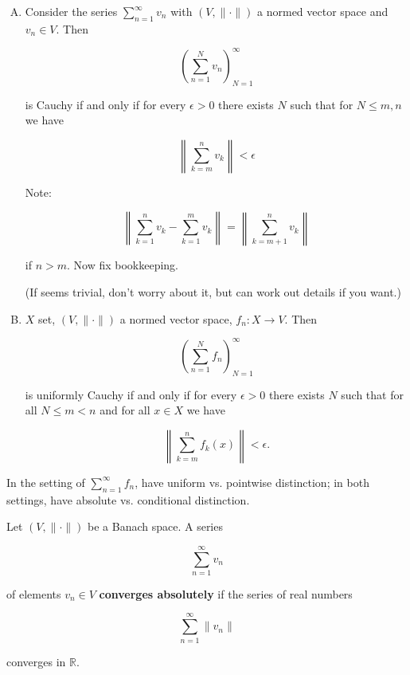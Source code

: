 \begin{exercise}

\begin{enumerate}[(A)]


\item Consider the series \( \sum_{n=1}^\infty v_n\) with \((V, \lVert \cdot \rVert)\) a normed vector space and \(v_n \in V\). Then 

\[
\left( \sum_{n=1}^N v_n \right)_{N=1}^\infty
\]

is Cauchy if and only if for every \(\epsilon > 0\) there exists \(N\) such that for \(N \leq m, n \) we have

\[
\left\lVert \sum_{k=m}^n v_k \right\rVert < \epsilon
\]

Note:

\[
\left\lVert  \sum_{k=1}^n v_k - \sum_{k=1}^m v_k \right\rVert = \left\lVert \sum_{k=m+1}^n v_k \right\rVert
\]

if \(n > m\). Now fix bookkeeping. 

(If seems trivial, don't worry about it, but can work out details if you want.)

\item \(X\) set, \((V, \lVert \cdot \rVert)\) a normed vector space, \(f_n: X \to V\). Then

\[
\left( \sum_{n=1}^N f_n\right)_{N=1}^\infty
\]

is uniformly Cauchy if and only if for every \(\epsilon >0\) there exists \(N\) such that for all \( N \leq m < n\) and for all \(x \in X\) we have

\[
\left\lVert \sum_{k=m}^n f_k(x) \right\rVert < \epsilon.
\]

\end{enumerate}

\end{exercise}

In the setting of \( \sum_{n=1}^\infty f_n\), have uniform vs. pointwise distinction; in both settings, have absolute vs. conditional distinction. 

\begin{definition}

Let \((V, \lVert \cdot \rVert)\) be a Banach space. A series

\[
\sum_{n=1}^\infty v_n
\]

of elements \(v_n \in V\) \textbf{converges absolutely} if the series of real numbers

\[
\sum_{n=1}^\infty \lVert v_n \rVert
\]

converges in \(\mathbb{R}\).

\end{definition}

